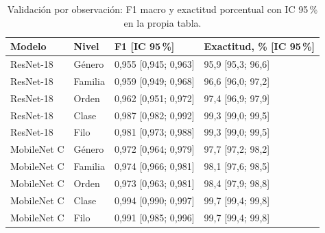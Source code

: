 \begin{table}[H]
\centering
\footnotesize
\caption{Validación por observación: F1 macro y exactitud porcentual con IC 95\,\% en la propia tabla.}
\label{tab:tax-val}
\begin{tabularx}{\linewidth}{l l Y Y}
\toprule
\textbf{Modelo} & \textbf{Nivel} & \textbf{F1 [IC 95\,\%]} & \textbf{Exactitud, \% [IC 95\,\%]}\\
\midrule
ResNet-18 & Género & 0,955 [0,945; 0,963] & 95,9 [95,3; 96,6]\\
ResNet-18 & Familia & 0,959 [0,949; 0,968] & 96,6 [96,0; 97,2]\\
ResNet-18 & Orden & 0,962 [0,951; 0,972] & 97,4 [96,9; 97,9]\\
ResNet-18 & Clase & 0,987 [0,982; 0,992] & 99,3 [99,0; 99,5]\\
ResNet-18 & Filo & 0,981 [0,973; 0,988] & 99,3 [99,0; 99,5]\\
MobileNet C & Género & 0,972 [0,964; 0,979] & 97,7 [97,2; 98,2]\\
MobileNet C & Familia & 0,974 [0,966; 0,981] & 98,1 [97,6; 98,5]\\
MobileNet C & Orden & 0,973 [0,963; 0,981] & 98,4 [97,9; 98,8]\\
MobileNet C & Clase & 0,994 [0,990; 0,997] & 99,7 [99,4; 99,8]\\
MobileNet C & Filo & 0,991 [0,985; 0,996] & 99,7 [99,4; 99,8]\\
\bottomrule
\end{tabularx}
\end{table}
